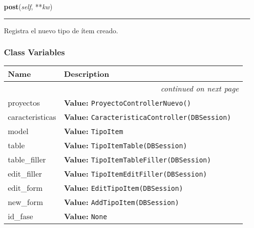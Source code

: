     \vspace{0.5ex}

\hspace{.8\funcindent}\begin{boxedminipage}{\funcwidth}

    \raggedright \textbf{post}(\textit{self}, **\textit{kw})

    \vspace{-1.5ex}

    \rule{\textwidth}{0.5\fboxrule}
\setlength{\parskip}{2ex}
    Registra el nuevo tipo de ítem creado.

\setlength{\parskip}{1ex}
    \end{boxedminipage}



  \subsubsection{Class Variables}

    \vspace{-1cm}
\hspace{\varindent}\begin{longtable}{|p{\varnamewidth}|p{\vardescrwidth}|l}
\cline{1-2}
\cline{1-2} \centering \textbf{Name} & \centering \textbf{Description}& \\
\cline{1-2}
\endhead\cline{1-2}\multicolumn{3}{r}{\small\textit{continued on next page}}\\\endfoot\cline{1-2}
\endlastfoot\raggedright p\-r\-o\-y\-e\-c\-t\-o\-s\- & \raggedright \textbf{Value:} 
{\tt ProyectoControllerNuevo()}&\\
\cline{1-2}
\raggedright c\-a\-r\-a\-c\-t\-e\-r\-i\-s\-t\-i\-c\-a\-s\- & \raggedright \textbf{Value:} 
{\tt CaracteristicaController(DBSession)}&\\
\cline{1-2}
\raggedright m\-o\-d\-e\-l\- & \raggedright \textbf{Value:} 
{\tt TipoItem}&\\
\cline{1-2}
\raggedright t\-a\-b\-l\-e\- & \raggedright \textbf{Value:} 
{\tt TipoItemTable(DBSession)}&\\
\cline{1-2}
\raggedright t\-a\-b\-l\-e\-\_\-f\-i\-l\-l\-e\-r\- & \raggedright \textbf{Value:} 
{\tt TipoItemTableFiller(DBSession)}&\\
\cline{1-2}
\raggedright e\-d\-i\-t\-\_\-f\-i\-l\-l\-e\-r\- & \raggedright \textbf{Value:} 
{\tt TipoItemEditFiller(DBSession)}&\\
\cline{1-2}
\raggedright e\-d\-i\-t\-\_\-f\-o\-r\-m\- & \raggedright \textbf{Value:} 
{\tt EditTipoItem(DBSession)}&\\
\cline{1-2}
\raggedright n\-e\-w\-\_\-f\-o\-r\-m\- & \raggedright \textbf{Value:} 
{\tt AddTipoItem(DBSession)}&\\
\cline{1-2}
\raggedright i\-d\-\_\-f\-a\-s\-e\- & \raggedright \textbf{Value:} 
{\tt None}&\\
\cline{1-2}
\end{longtable}

